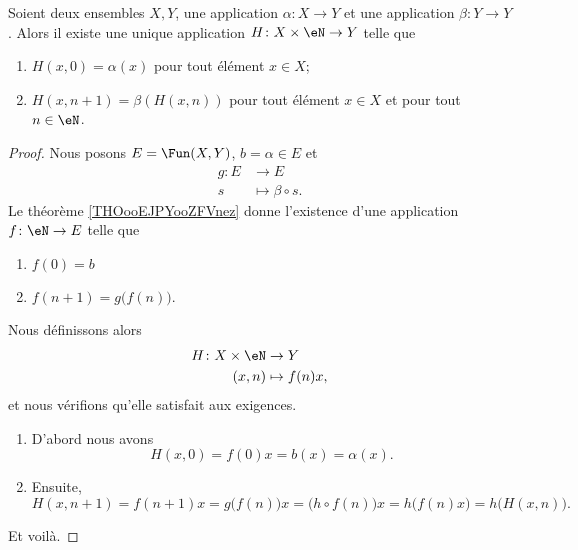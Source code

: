  
\begin{corollary}       \label{CORooVNHKooRkKtXf}
    Soient deux ensembles \( X,Y\), une application \( \alpha\colon X\to Y\) et une application \( \beta\colon Y\to Y\). Alors il existe une unique application \( H\colon X\times \eN\to Y\) telle que
\begin{enumerate}
    \item
  $H(x , 0) = \alpha(x)$   pour tout élément $x\in X$;
  \item
 $H(x , n+1 ) = \beta( H( x , n) )$ pour tout élément \( x\in X\) et pour tout \( n\in \eN\).
\end{enumerate}
\end{corollary}

\begin{proof}
    Nous posons \( E=\Fun(X,Y)\), \( b=\alpha\in E\) et
    \begin{equation}
        \begin{aligned}
            g\colon E&\to E \\
            s&\mapsto \beta\circ s. 
        \end{aligned}
    \end{equation}
    Le théorème \ref{THOooEJPYooZFVnez} donne l'existence d'une application \( f\colon \eN\to E\) telle que
    \begin{enumerate}
        \item
            \( f(0)=b\)
        \item
            \( f(n+1)=g\big( f(n) \big)\).
    \end{enumerate}
    Nous définissons alors
    \begin{equation}
        \begin{aligned}
            H\colon X\times \eN&\to Y \\
            (x,n)&\mapsto f(n)x, 
        \end{aligned}
    \end{equation}
    et nous vérifions qu'elle satisfait aux exigences.

    \begin{enumerate}
        \item
            D'abord nous avons
            \begin{equation}
                H(x,0)=f(0)x=b(x)=\alpha(x).
            \end{equation}
        \item
            Ensuite,
            \begin{equation}
                H(x,n+1)=f(n+1)x=g\big( f(n) \big)x=\big( h\circ f(n) \big)x=h\big( f(n)x \big)=h\big( H(x,n) \big).
            \end{equation}
    \end{enumerate}
    Et voilà.
\end{proof}

